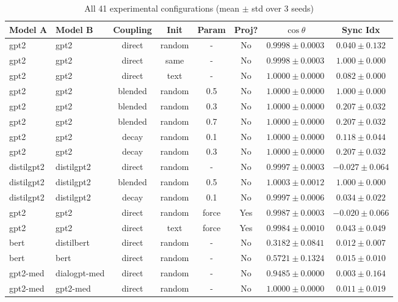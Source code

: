 \documentclass[10pt]{article} %
\theoremstyle{plain}
\theoremstyle{definition}
\theoremstyle{remark}
\begin{document}
\begin{table}[h!]
\centering
\caption{All 41 experimental configurations (mean $\pm$ std over 3 seeds)}
\label{tab:complete}
\scriptsize
\begin{tabular}{llcccccc}
\toprule
\textbf{Model A} & \textbf{Model B} & \textbf{Coupling} & \textbf{Init} & \textbf{Param} & \textbf{Proj?} & \textbf{$\cos \theta$} & \textbf{Sync Idx} \\
\midrule
gpt2 & gpt2 & direct & random &  -  & No & $0.9998 \pm 0.0003$ & $0.040 \pm 0.132$ \\
gpt2 & gpt2 & direct & same &  -  & No & $0.9998 \pm 0.0003$ & $1.000 \pm 0.000$ \\
gpt2 & gpt2 & direct & text &  -  & No & $1.0000 \pm 0.0000$ & $0.082 \pm 0.000$ \\
gpt2 & gpt2 & blended & random & 0.5 & No & $1.0000 \pm 0.0000$ & $1.000 \pm 0.000$ \\
gpt2 & gpt2 & blended & random & 0.3 & No & $1.0000 \pm 0.0000$ & $0.207 \pm 0.032$ \\
gpt2 & gpt2 & blended & random & 0.7 & No & $1.0000 \pm 0.0000$ & $0.207 \pm 0.032$ \\
gpt2 & gpt2 & decay & random & 0.1 & No & $1.0000 \pm 0.0000$ & $0.118 \pm 0.044$ \\
gpt2 & gpt2 & decay & random & 0.3 & No & $1.0000 \pm 0.0000$ & $0.207 \pm 0.032$ \\
\midrule
distilgpt2 & distilgpt2 & direct & random &  -  & No & $0.9997 \pm 0.0003$ & $-0.027 \pm 0.064$ \\
distilgpt2 & distilgpt2 & blended & random & 0.5 & No & $1.0003 \pm 0.0012$ & $1.000 \pm 0.000$ \\
distilgpt2 & distilgpt2 & decay & random & 0.1 & No & $0.9997 \pm 0.0006$ & $0.034 \pm 0.022$ \\
\midrule
gpt2 & gpt2 & direct & random & force & Yes & $0.9987 \pm 0.0003$ & $-0.020 \pm 0.066$ \\
gpt2 & gpt2 & direct & text & force & Yes & $0.9984 \pm 0.0010$ & $0.043 \pm 0.049$ \\
\midrule
bert & distilbert & direct & random &  -  & No & $0.3182 \pm 0.0841$ & $0.012 \pm 0.007$ \\
bert & bert & direct & random &  -  & No & $0.5721 \pm 0.1324$ & $0.015 \pm 0.010$ \\
\midrule
gpt2-med & dialogpt-med & direct & random &  -  & No & $0.9485 \pm 0.0000$ & $0.003 \pm 0.164$ \\
gpt2-med & gpt2-med & direct & random &  -  & No & $1.0000 \pm 0.0000$ & $0.011 \pm 0.019$ \\

\end{tabular}
\end{table}
\end{document}
